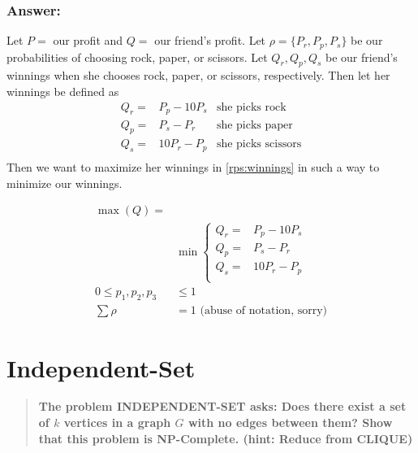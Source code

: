 \documentclass[titlepage]{article}\usepackage[]{graphicx}\usepackage[]{color}
\begin{document}
  \subsubsection{Answer:}
  Let $P = $ our profit and $Q = $ our friend's profit. Let $\rho = \{P_r, P_p, P_s\}$ be
  our probabilities of choosing rock, paper, or scissors. Let $Q_r, Q_p, Q_s$
  be our friend's winnings when she chooses rock, paper, or scissors,
  respectively.
  Then let her winnings be defined as
  \begin{equation}
    \begin{aligned}
      Q_r =& P_p - 10P_s &\text{she picks rock} \\
      Q_p =& P_s - P_r   &\text{she picks paper} \\
      Q_s =& 10P_r - P_p &\text{she picks scissors} \\
    \end{aligned}
    \label{rps:winnings}
  \end{equation}
  Then we want to maximize her winnings in \ref{rps:winnings} in such a way to
  minimize our winnings. 

  \begin{equation}
    \begin{aligned}
      \label{rps:constraints}
      \max(Q) =& \\
      &\min \begin{cases} Q_r =& P_p - 10P_s \\
                    Q_p =& P_s - P_r   \\
                    Q_s =& 10P_r - P_p \\
                  \end{cases} \\
       0 \leq p_1, p_2, p_3 &\leq 1 \\ 
       \sum \rho  &= 1  \text{  (abuse of notation, sorry)}
    \end{aligned}
  \end{equation}

  
  \vspace{3cm}

\section{Independent-Set}
  \begin{quote}
  \textbf{The problem INDEPENDENT-SET asks: Does there exist a set of $k$
  vertices in a graph $G$ with no edges between them? Show that this problem is
  NP-Complete. (hint: Reduce from CLIQUE)}
  \end{quote}
\end{document}
